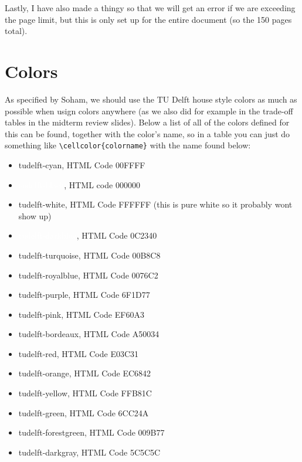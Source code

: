 \documentclass[../main.tex]{subfiles}
\begin{document}
Lastly, I have also made a thingy so that we will get an error if we are exceeding the page limit, but this is only set up for the entire document (so the 150 pages total).

\section{Colors}

As specified by Soham, we should use the TU Delft house style colors as much as possible when usign colors anywhere (as we also did for example in the trade-off tables in the midterm review slides). Below a list of all of the colors defined for this can be found, together with the color's name, so in a table you can just do something like \texttt{\textbackslash cellcolor\{colorname\}} with the name found below:

\begin{itemize}
    \item \colorbox{tudelft-cyan}{tudelft-cyan}, HTML Code 00FFFF
    \item \colorbox{tudelft-black}{\textcolor{white}{tudelft-black}}, HTML code 000000
    \item \colorbox{tudelft-white}{tudelft-white}, HTML Code FFFFFF (this is pure white so it probably wont show up)
    \item \colorbox{tudelft-darkblue}{\textcolor{white}{tudelft-darkblue}}, HTML Code 0C2340
    \item \colorbox{tudelft-turquoise}{tudelft-turquoise}, HTML Code 00B8C8
    \item \colorbox{tudelft-royalblue}{tudelft-royalblue}, HTML Code 0076C2
    \item \colorbox{tudelft-purple}{tudelft-purple}, HTML Code 6F1D77
    \item \colorbox{tudelft-pink}{tudelft-pink}, HTML Code EF60A3
    \item \colorbox{tudelft-bordeaux}{tudelft-bordeaux}, HTML Code A50034
    \item \colorbox{tudelft-red}{tudelft-red}, HTML Code E03C31
    \item \colorbox{tudelft-orange}{tudelft-orange}, HTML Code EC6842
    \item \colorbox{tudelft-yellow}{tudelft-yellow}, HTML Code FFB81C
    \item \colorbox{tudelft-green}{tudelft-green}, HTML Code 6CC24A
    \item \colorbox{tudelft-forestgreen}{tudelft-forestgreen}, HTML Code 009B77
    \item \colorbox{tudelft-darkgray}{tudelft-darkgray}, HTML Code 5C5C5C
\end{itemize}
\end{document}

